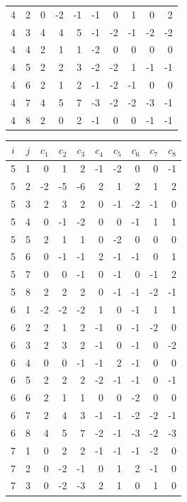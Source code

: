 \documentclass[twoside,english]{paper}
\numberwithin{equation}{section}
\numberwithin{figure}{section}
\theoremstyle{definition}
\theoremstyle{remark}
\begin{document}
\begin{table}[H]
\begin{minipage}[t]{0.48\textwidth}
\begin{tabular}{cc|rrrrrrrr}
4 & 2 & 0 & -2 & -1 & -1 & 0 & 1 & 0 & 2 \\
4 & 3 & 4 & 4 & 5 & -1 & -2 & -1 & -2 & -2 \\
4 & 4 & 2 & 1 & 1 & -2 & 0 & 0 & 0 & 0 \\
4 & 5 & 2 & 2 & 3 & -2 & -2 & 1 & -1 & -1 \\
4 & 6 & 2 & 1 & 2 & -1 & -2 & -1 & 0 & 0 \\
4 & 7 & 4 & 5 & 7 & -3 & -2 & -2 & -3 & -1 \\
4 & 8 & 2 & 0 & 2 & -1 & 0 & 0 & -1 & -1 \\
\bottomrule
\end{tabular}
\end{minipage}\hfill
\begin{minipage}[t]{0.48\textwidth}
\centering
\begin{tabular}{cc|rrrrrrrr}
\toprule
$i$ & $j$ & $c_1$ & $c_2$ & $c_3$ & $c_4$ & $c_5$ & $c_6$ & $c_7$ & $c_8$ \\
\midrule
5 & 1 & 0 & 1 & 2 & -1 & -2 & 0 & 0 & -1 \\
5 & 2 & -2 & -5 & -6 & 2 & 1 & 2 & 1 & 2 \\
5 & 3 & 2 & 3 & 2 & 0 & -1 & -2 & -1 & 0 \\
5 & 4 & 0 & -1 & -2 & 0 & 0 & -1 & 1 & 1 \\
5 & 5 & 2 & 1 & 1 & 0 & -2 & 0 & 0 & 0 \\
5 & 6 & 0 & -1 & -1 & 2 & -1 & -1 & 0 & 1 \\
5 & 7 & 0 & 0 & -1 & 0 & -1 & 0 & -1 & 2 \\
5 & 8 & 2 & 2 & 2 & 0 & -1 & -1 & -2 & -1 \\
\midrule
6 & 1 & -2 & -2 & -2 & 1 & 0 & -1 & 1 & 1 \\
6 & 2 & 2 & 1 & 2 & -1 & 0 & -1 & -2 & 0 \\
6 & 3 & 2 & 3 & 2 & -1 & 0 & -1 & 0 & -2 \\
6 & 4 & 0 & 0 & -1 & -1 & 2 & -1 & 0 & 0 \\
6 & 5 & 2 & 2 & 2 & -2 & -1 & -1 & 0 & -1 \\
6 & 6 & 2 & 1 & 1 & 0 & 0 & -2 & 0 & 0 \\
6 & 7 & 2 & 4 & 3 & -1 & -1 & -2 & -2 & -1 \\
6 & 8 & 4 & 5 & 7 & -2 & -1 & -3 & -2 & -3 \\
\midrule
7 & 1 & 0 & 2 & 2 & -1 & -1 & -1 & -2 & 0 \\
7 & 2 & 0 & -2 & -1 & 0 & 1 & 2 & -1 & 0 \\
7 & 3 & 0 & -2 & -3 & 2 & 1 & 0 & 1 & 0 \\

\end{tabular}
\end{minipage}
\end{table}
\end{document}
